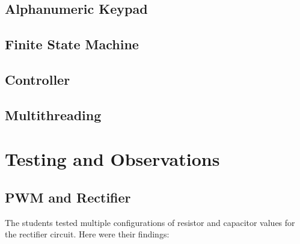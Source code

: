 \documentclass[12pt]{report}
\begin{document}
\subsection{Alphanumeric Keypad}


\subsection{Finite State Machine}


\subsection{Controller}

\subsection{Multithreading}

\section{Testing and Observations}

\subsection{PWM and Rectifier}\label{testpwm}

The students tested multiple configurations of resistor and capacitor values for the rectifier circuit. Here were their findings:\\
\end{document}
